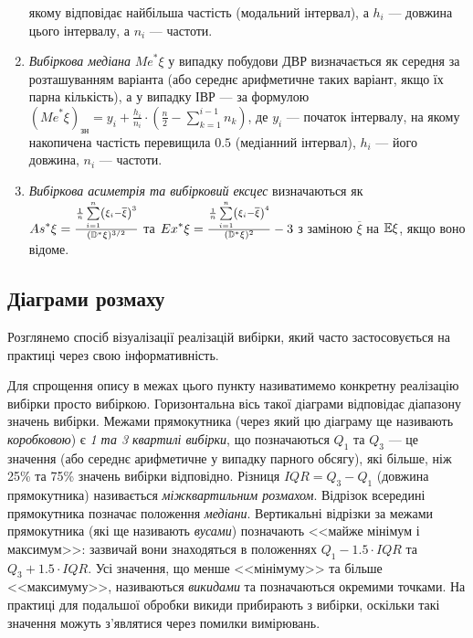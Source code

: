 \begin{enumerate}
    якому відповідає найбільша частість (модальний інтервал), а $h_i$ --- довжина цього інтервалу, а $n_i$ --- частоти.
    \item \emph{Вибіркова медіана} ${Me}^* \xi$ у випадку побудови ДВР визначається як середня за розташуванням варіанта (або середнє арифметичне 
    таких варіант, якщо їх парна кількість), а у випадку ІВР --- за формулою 
    $({Me}^* \xi)_{\text{зн}} = y_i + \frac{h_i}{n_i} \cdot \left(\frac{n}{2} - \sum\limits_{k=1}^{i-1} n_k \right)$, де 
    $y_i$ --- початок інтервалу, на якому накопичена частість перевищила $0.5$ (медіанний інтервал), $h_i$ --- його довжина,
    $n_i$ --- частоти.
    \item \emph{Вибіркова асиметрія та вибірковий ексцес} визначаються як 
    ${As}^* \xi = \frac{\frac{1}{n}\sum\limits_{i=1}^n \left(\xi_i - \overline{\xi} \right)^3}{(\mathbb{D}^*\xi)^{3/2}}$ та
    ${Ex}^* \xi = \frac{\frac{1}{n}\sum\limits_{i=1}^n \left(\xi_i - \overline{\xi} \right)^4}{(\mathbb{D}^*\xi)^{2}} - 3$ з заміною
    $\overline{\xi}$ на $\mathbb{E}\xi$, якщо воно відоме.
\end{enumerate}

\subsection{Діаграми розмаху}
Розглянемо спосіб візуалізації реалізацій вибірки, який часто застосовується на практиці через свою інформативність.
\begin{center}
\end{center}
Для спрощення опису в межах цього пункту називатимемо конкретну реалізацію вибірки просто вибіркою.
Горизонтальна вісь такої діаграми відповідає діапазону значень вибірки. Межами прямокутника (через який цю діаграму ще називають
\emph{коробковою}) є \emph{1 та 3 квартилі вибірки}, що позначаються $Q_1$ та $Q_3$ --- це значення (або середнє арифметичне у випадку парного обсягу), які більше, ніж 25\% та 75\% значень вибірки відповідно.
Різниця ${IQR} = Q_3 - Q_1$ (довжина прямокутника) називається \emph{міжквартильним розмахом}. Відрізок всередині прямокутника позначає положення \emph{медіани}.
Вертикальні відрізки за межами прямокутника (які ще називають \emph{вусами}) позначають <<майже мінімум і максимум>>: зазвичай вони знаходяться
в положеннях $Q_1 - 1.5\cdot{IQR}$ та $Q_3 + 1.5\cdot{IQR}$. Усі значення, що менше <<мінімуму>> та більше <<максимуму>>, називаються \emph{викидами} та 
позначаються окремими точками. На практиці для подальшої обробки викиди прибирають з вибірки, оскільки такі значення можуть з'являтися через помилки вимірювань.

